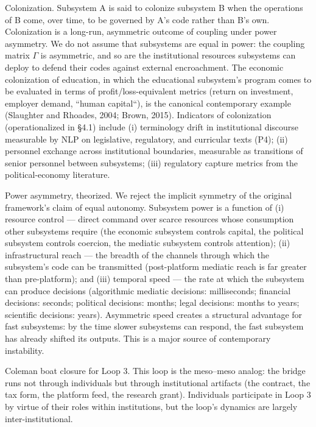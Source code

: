 \documentclass[12pt,a4paper]{article}
\begin{document}
Colonization. Subsystem A is said to colonize subsystem B when the operations of B come, over time, to be governed by A's code rather than B's own. Colonization is a long-run, asymmetric outcome of coupling under power asymmetry. We do not assume that subsystems are equal in power: the coupling matrix $\Gamma$ is asymmetric, and so are the institutional resources subsystems can deploy to defend their codes against external encroachment. The economic colonization of education, in which the educational subsystem's program comes to be evaluated in terms of profit/loss-equivalent metrics (return on investment, employer demand, ``human capital``), is the canonical contemporary example (Slaughter and Rhoades, 2004; Brown, 2015). Indicators of colonization (operationalized in §4.1) include (i) terminology drift in institutional discourse measurable by NLP on legislative, regulatory, and curricular texts (P4); (ii) personnel exchange across institutional boundaries, measurable as transitions of senior personnel between subsystems; (iii) regulatory capture metrics from the political-economy literature.


Power asymmetry, theorized. We reject the implicit symmetry of the original framework's claim of equal autonomy. Subsystem power is a function of (i) resource control --- direct command over scarce resources whose consumption other subsystems require (the economic subsystem controls capital, the political subsystem controls coercion, the mediatic subsystem controls attention); (ii) infrastructural reach --- the breadth of the channels through which the subsystem's code can be transmitted (post-platform mediatic reach is far greater than pre-platform); and (iii) temporal speed --- the rate at which the subsystem can produce decisions (algorithmic mediatic decisions: milliseconds; financial decisions: seconds; political decisions: months; legal decisions: months to years; scientific decisions: years). Asymmetric speed creates a structural advantage for fast subsystems: by the time slower subsystems can respond, the fast subsystem has already shifted its outputs. This is a major source of contemporary instability.


Coleman boat closure for Loop 3. This loop is the meso--meso analog: the bridge runs not through individuals but through institutional artifacts (the contract, the tax form, the platform feed, the research grant). Individuals participate in Loop 3 by virtue of their roles within institutions, but the loop's dynamics are largely inter-institutional.
\end{document}
